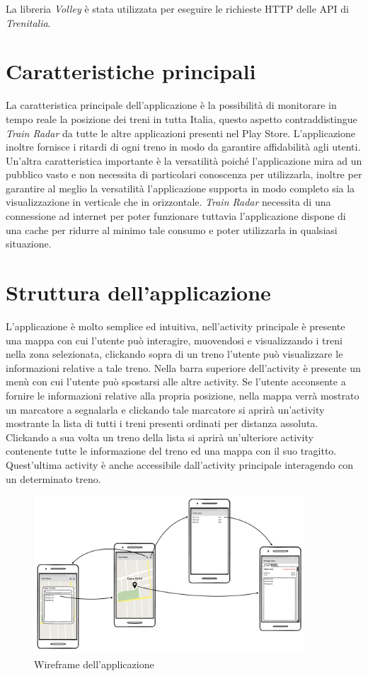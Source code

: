 \documentclass[a4paper,10pt]{article}
\begin{document}
    \medskip
    \noindent
    La libreria \emph{Volley} \cite{volley} è stata utilizzata per eseguire le richieste HTTP delle API di \emph{Trenitalia}.

\section{Caratteristiche principali}
  La caratteristica principale dell'applicazione è la possibilità di monitorare in tempo reale la posizione dei treni in tutta Italia, questo aspetto contraddistingue \emph{Train Radar} da tutte le altre applicazioni presenti nel Play Store. L'applicazione inoltre fornisce i ritardi di ogni treno in modo da garantire affidabilità agli utenti. Un'altra caratteristica importante è la versatilità poiché l'applicazione mira ad un pubblico vasto e non necessita di particolari conoscenza per utilizzarla, inoltre per garantire al meglio la versatilità l'applicazione supporta in modo completo sia la visualizzazione in verticale che in orizzontale. \emph{Train Radar} necessita di una connessione ad internet per poter funzionare tuttavia l'applicazione dispone di una cache per ridurre al minimo tale consumo e poter utilizzarla in qualsiasi situazione.

\section{Struttura dell'applicazione}
  L'applicazione è molto semplice ed intuitiva, nell'activity principale è presente una mappa con cui l'utente può interagire, muovendosi e visualizzando i treni nella zona selezionata, clickando sopra di un treno l'utente può visualizzare le informazioni relative a tale treno. Nella barra superiore dell'activity è presente un menù con cui l'utente può spostarsi alle altre activity. Se l'utente acconsente a fornire le informazioni relative alla propria posizione, nella mappa verrà mostrato un marcatore a segnalarla e clickando tale marcatore si aprirà un'activity mostrante la lista di tutti i treni presenti ordinati per distanza assoluta. Clickando a sua volta un treno della lista si aprirà un'ulteriore activity contenente tutte le informazione del treno ed una mappa con il suo tragitto. Quest'ultima activity è anche accessibile dall'activity principale interagendo con un determinato treno.

  \begin{figure}[h!]
    \centering
    \includegraphics[width=0.9\textwidth]{images/wireframe}
    \caption{Wireframe dell'applicazione}
  \end{figure}
\end{document}
